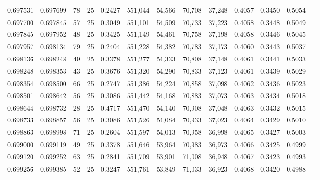 \begin{tabular}{rrrrrrrrrrrrr}
0.697531 & 0.697699 &    78 &  25 &                                     0.2427 & 551,044 &  54,566 &  70,708 &  37,248 & 0.4057 & 0.3450 & 0.5054 \\
0.697700 & 0.697845 &    57 &  25 &                                     0.3049 & 551,101 &  54,509 &  70,733 &  37,223 & 0.4058 & 0.3448 & 0.5049 \\
0.697845 & 0.697952 &    48 &  25 &                                     0.3425 & 551,149 &  54,461 &  70,758 &  37,198 & 0.4058 & 0.3446 & 0.5045 \\
0.697957 & 0.698134 &    79 &  25 &                                     0.2404 & 551,228 &  54,382 &  70,783 &  37,173 & 0.4060 & 0.3443 & 0.5037 \\
0.698136 & 0.698248 &    49 &  25 &                                     0.3378 & 551,277 &  54,333 &  70,808 &  37,148 & 0.4061 & 0.3441 & 0.5033 \\
0.698248 & 0.698353 &    43 &  25 &                                     0.3676 & 551,320 &  54,290 &  70,833 &  37,123 & 0.4061 & 0.3439 & 0.5029 \\
0.698354 & 0.698500 &    66 &  25 &                                     0.2747 & 551,386 &  54,224 &  70,858 &  37,098 & 0.4062 & 0.3436 & 0.5023 \\
0.698501 & 0.698642 &    56 &  25 &                                     0.3086 & 551,442 &  54,168 &  70,883 &  37,073 & 0.4063 & 0.3434 & 0.5018 \\
0.698644 & 0.698732 &    28 &  25 &                                     0.4717 & 551,470 &  54,140 &  70,908 &  37,048 & 0.4063 & 0.3432 & 0.5015 \\
0.698733 & 0.698857 &    56 &  25 &                                     0.3086 & 551,526 &  54,084 &  70,933 &  37,023 & 0.4064 & 0.3429 & 0.5010 \\
0.698863 & 0.698998 &    71 &  25 &                                     0.2604 & 551,597 &  54,013 &  70,958 &  36,998 & 0.4065 & 0.3427 & 0.5003 \\
0.699000 & 0.699119 &    49 &  25 &                                     0.3378 & 551,646 &  53,964 &  70,983 &  36,973 & 0.4066 & 0.3425 & 0.4999 \\
0.699120 & 0.699252 &    63 &  25 &                                     0.2841 & 551,709 &  53,901 &  71,008 &  36,948 & 0.4067 & 0.3423 & 0.4993 \\
0.699256 & 0.699385 &    52 &  25 &                                     0.3247 & 551,761 &  53,849 &  71,033 &  36,923 & 0.4068 & 0.3420 & 0.4988 \\

\end{tabular}
